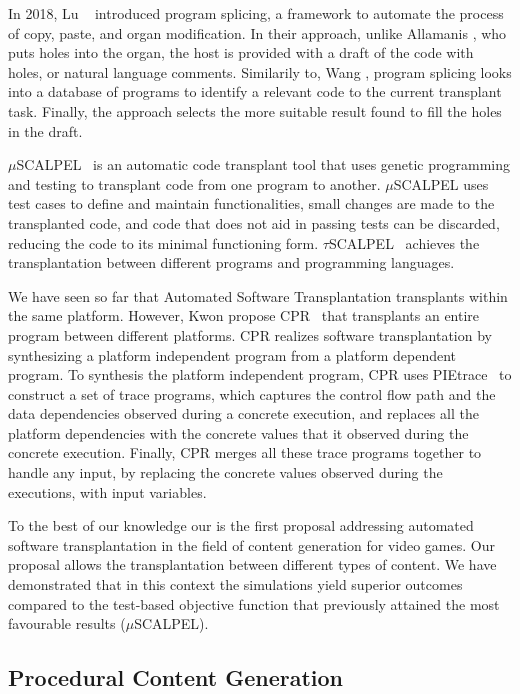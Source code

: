 In 2018, Lu \etal~\cite{lu2018program} introduced program splicing, a framework to automate the process of copy, paste, and organ modification. In their approach, unlike Allamanis \etal, who puts holes into the organ, the host is provided with a draft of the code with holes, or natural language comments. Similarily to, Wang \etal, program splicing looks into a database of programs to identify a relevant code to the current transplant task. Finally, the approach selects the more suitable result found to fill the holes in the draft.

$\mu$SCALPEL~\cite{barr2015automated} is an automatic code transplant tool that uses genetic programming and testing to transplant code from one program to another. $\mu$SCALPEL uses test cases to define and maintain functionalities, small changes are made to the transplanted code, and code that does not aid in passing tests can be discarded, reducing the code to its minimal functioning form. $\tau$SCALPEL~\cite{marginean2021automated} achieves the transplantation between different programs and programming languages. 

We have seen so far that Automated Software Transplantation transplants within the same platform. However, Kwon \etal propose CPR~\cite{kwon2017cpr} that transplants an entire program between different platforms. CPR realizes software transplantation by synthesizing a platform independent program from a platform dependent program. To synthesis the platform independent program, CPR uses PIEtrace~\cite{kwon2013pietrace} to construct a set of trace programs, which captures the control flow path and the data dependencies observed during a concrete execution, and replaces all the platform dependencies with the concrete values that it observed during the concrete execution. Finally, CPR merges all these trace programs together to handle any input, by replacing the concrete values observed during the executions, with input variables. 

To the best of our knowledge our is the first proposal addressing automated software transplantation in the field of content generation for video games. Our proposal allows the transplantation between different types of content. We have demonstrated that in this context the simulations yield superior outcomes compared to the test-based objective function that previously attained the most favourable results ($\mu$SCALPEL).

\subsection{Procedural Content Generation}


